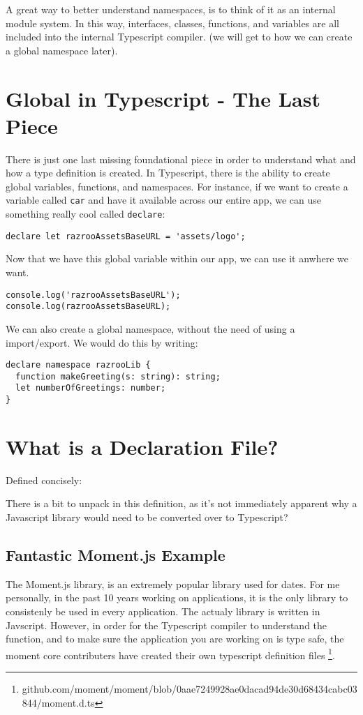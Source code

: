 A great way to better understand namespaces, is to think of it as an internal module system. In this way, interfaces, classes, functions, and variables are all included into the internal Typescript compiler. (we will get to how we can create a global namespace later).

\section{Global in Typescript - The Last Piece}
There is just one last missing foundational piece in order to understand what and how a type definition is created. In Typescript, there is the ability to 
create global variables, functions, and namespaces. For instance, if we want to create a variable called \lstinline{car} and have it available across our entire app, we can use something really cool called \lstinline{declare}: 

\begin{verbatim}
declare let razrooAssetsBaseURL = 'assets/logo';  
\end{verbatim}

Now that we have this global variable within our app, we can use it anwhere we want. 
\begin{lstlisting}[caption=useless.component.ts]
console.log('razrooAssetsBaseURL');
console.log(razrooAssetsBaseURL);
\end{lstlisting}

We can also create a global namespace, without the need of using a import/export. We would do this by writing: 
\begin{verbatim}
declare namespace razrooLib {
  function makeGreeting(s: string): string;
  let numberOfGreetings: number;
}
\end{verbatim}

\section{What is a Declaration File?}
Defined concisely: 
\begin{quote}
\end{quote}

There is a bit to unpack in this definition, as it's not immediately apparent why a Javascript library would need to be converted over to Typescript? 

\subsection{Fantastic Moment.js Example }
The Moment.js library, is an extremely popular library used for dates. For me personally, in the past 10 years working on applications, it is the only library to consistenly be used in every application. The actualy library is written in Javscript. However, in order for the Typescript compiler to understand the function, and to make sure the application you are working on is type safe, the moment core contributers have created their own typescript definition files \footnote{github.com/moment/moment/blob/0aae7249928ae0dacad94de30d68434cabc03844/moment.d.ts}.  

